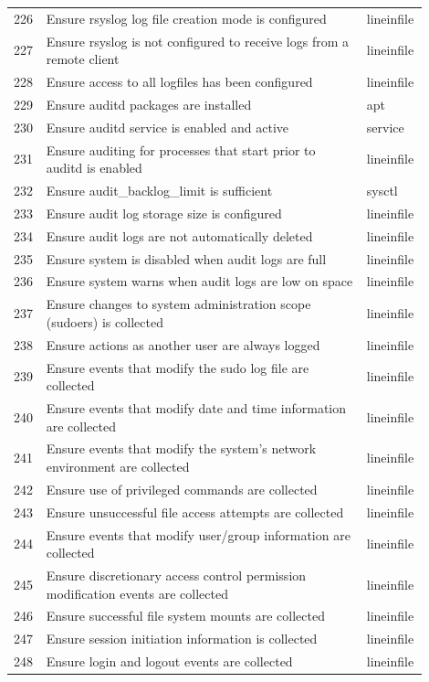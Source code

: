 \begin{longtable}{|p{0.05\linewidth}|p{0.75\linewidth}|p{0.1\linewidth}|}
226 & Ensure rsyslog log file creation mode is configured & lineinfile \\
227 & Ensure rsyslog is not configured to receive logs from a remote client & lineinfile \\
228 & Ensure access to all logfiles has been configured & lineinfile \\
229 & Ensure auditd packages are installed & apt \\
230 & Ensure auditd service is enabled and active & service \\
231 & Ensure auditing for processes that start prior to auditd is enabled & lineinfile \\
232 & Ensure audit\_backlog\_limit is sufficient & sysctl \\
233 & Ensure audit log storage size is configured & lineinfile \\
234 & Ensure audit logs are not automatically deleted & lineinfile \\
235 & Ensure system is disabled when audit logs are full & lineinfile \\
236 & Ensure system warns when audit logs are low on space & lineinfile \\
237 & Ensure changes to system administration scope (sudoers) is collected & lineinfile \\
238 & Ensure actions as another user are always logged & lineinfile \\
239 & Ensure events that modify the sudo log file are collected & lineinfile \\
240 & Ensure events that modify date and time information are collected & lineinfile \\
241 & Ensure events that modify the system's network environment are collected & lineinfile \\
242 & Ensure use of privileged commands are collected & lineinfile \\
243 & Ensure unsuccessful file access attempts are collected & lineinfile \\
244 & Ensure events that modify user/group information are collected & lineinfile \\
245 & Ensure discretionary access control permission modification events are collected & lineinfile \\
246 & Ensure successful file system mounts are collected & lineinfile \\
247 & Ensure session initiation information is collected & lineinfile \\
248 & Ensure login and logout events are collected & lineinfile \\

\end{longtable}
